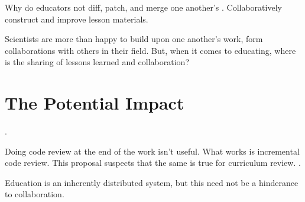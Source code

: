 \documentclass[11pt]{article}
\begin{document}
          Why do educators not diff, patch, and merge one another's . 
          Collaboratively construct and improve lesson materials. 
         
          Scientists are more than happy to build upon one another's work, form 
          collaborations with others in their field. But, 
          when it comes to educating, where is the sharing of lessons learned 
          and collaboration? 

          \section{The Potential Impact}
          \cite{wilson_software_2014}.

          Doing code review at the end of the work isn't useful. What works is 
          incremental code review. This proposal suspects that the same is true 
          for curriculum review. 
          \cite{wilson_software_2014}.

          Education is an inherently distributed system, but this need not be a 
          hinderance to collaboration.

          
          

          
\end{document}
